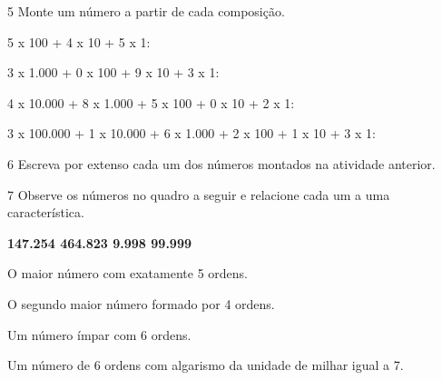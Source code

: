 
\num{5} Monte um número a partir de cada composição.

\begin{escolha}
\item 5 x 100 + 4 x 10 + 5 x 1: 

\item 3 x 1.000 + 0 x 100 + 9 x 10 + 3 x 1: 

\item 4 x 10.000 + 8 x 1.000 + 5 x 100 + 0 x 10 + 2 x 1: 

\item 3 x 100.000 + 1 x 10.000 + 6 x 1.000 + 2 x 100 + 1 x 10 + 3 x 1: 
\end{escolha}

\num{6} Escreva por extenso cada um dos números montados na atividade anterior.

\begin{escolha}
\item {}

\item {}

\item {}

\item {}
\end{escolha}

\pagebreak
\num{7} Observe os números no quadro a seguir e relacione cada um a uma característica.

\begin{mdframed}[linewidth=2pt,linecolor=azul!20,backgroundcolor=azul!20,roundcorner=2pt]
\textbf{147.254 \hfill 464.823 \hfill 9.998 \hfill 99.999}
\end{mdframed}

\begin{escolha}
\item O maior número com exatamente 5 ordens. 

\item O segundo maior número formado por 4 ordens. 

\item Um número ímpar com 6 ordens. 

\item Um número de 6 ordens com algarismo da unidade de milhar igual a 7. 
\end{escolha}

